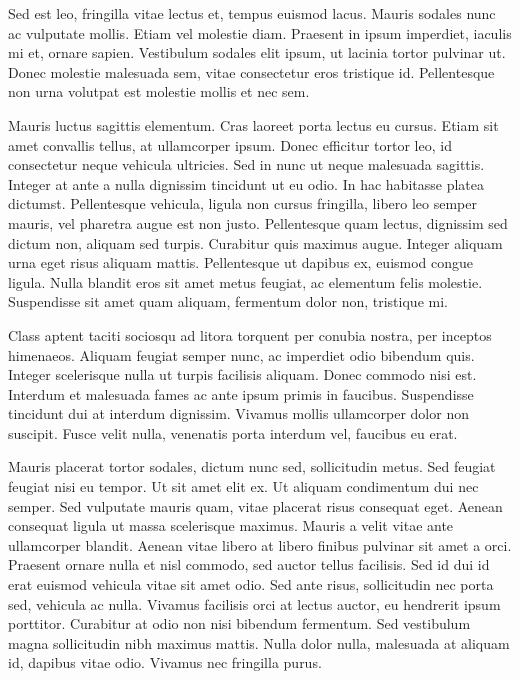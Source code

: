 \documentclass[a4paper,10pt,twoside]{article} %
\begin{document}
Sed est leo, fringilla vitae lectus et, tempus euismod lacus.
Mauris sodales nunc ac vulputate mollis.
Etiam vel molestie diam.
Praesent in ipsum imperdiet, iaculis mi et, ornare sapien.
Vestibulum sodales elit ipsum, ut lacinia tortor pulvinar ut.
Donec molestie malesuada sem, vitae consectetur eros tristique id.
Pellentesque non urna volutpat est molestie mollis et nec sem.

Mauris luctus sagittis elementum.
Cras laoreet porta lectus eu cursus.
Etiam sit amet convallis tellus, at ullamcorper ipsum.
Donec efficitur tortor leo, id consectetur neque vehicula ultricies.
Sed in nunc ut neque malesuada sagittis.
Integer at ante a nulla dignissim tincidunt ut eu odio.
In hac habitasse platea dictumst.
Pellentesque vehicula, ligula non cursus fringilla, libero leo semper mauris, vel pharetra augue est non justo.
Pellentesque quam lectus, dignissim sed dictum non, aliquam sed turpis.
Curabitur quis maximus augue.
Integer aliquam urna eget risus aliquam mattis.
Pellentesque ut dapibus ex, euismod congue ligula.
Nulla blandit eros sit amet metus feugiat, ac elementum felis molestie.
Suspendisse sit amet quam aliquam, fermentum dolor non, tristique mi.

Class aptent taciti sociosqu ad litora torquent per conubia nostra, per inceptos himenaeos.
Aliquam feugiat semper nunc, ac imperdiet odio bibendum quis.
Integer scelerisque nulla ut turpis facilisis aliquam.
Donec commodo nisi est.
Interdum et malesuada fames ac ante ipsum primis in faucibus.
Suspendisse tincidunt dui at interdum dignissim.
Vivamus mollis ullamcorper dolor non suscipit.
Fusce velit nulla, venenatis porta interdum vel, faucibus eu erat.

Mauris placerat tortor sodales, dictum nunc sed, sollicitudin metus.
Sed feugiat feugiat nisi eu tempor.
Ut sit amet elit ex.
Ut aliquam condimentum dui nec semper.
Sed vulputate mauris quam, vitae placerat risus consequat eget.
Aenean consequat ligula ut massa scelerisque maximus.
Mauris a velit vitae ante ullamcorper blandit.
Aenean vitae libero at libero finibus pulvinar sit amet a orci.
Praesent ornare nulla et nisl commodo, sed auctor tellus facilisis.
Sed id dui id erat euismod vehicula vitae sit amet odio.
Sed ante risus, sollicitudin nec porta sed, vehicula ac nulla.
Vivamus facilisis orci at lectus auctor, eu hendrerit ipsum porttitor.
Curabitur at odio non nisi bibendum fermentum.
Sed vestibulum magna sollicitudin nibh maximus mattis.
Nulla dolor nulla, malesuada at aliquam id, dapibus vitae odio.
Vivamus nec fringilla purus.
\end{document}
